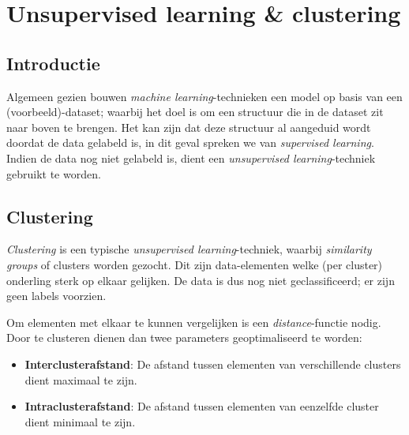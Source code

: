 \chapter{Unsupervised learning \& clustering}
\section{Introductie}
Algemeen gezien bouwen \emph{machine learning}-technieken een model op basis van een (voorbeeld)-dataset; waarbij het doel is om een structuur die in de dataset zit naar boven te brengen. Het kan zijn dat deze structuur al aangeduid wordt doordat de data gelabeld is, in dit geval spreken we van \emph{supervised learning}. Indien de data nog niet gelabeld is, dient een \emph{unsupervised learning}-techniek gebruikt te worden.

\section{Clustering}
\emph{Clustering} is een typische \emph{unsupervised learning}-techniek, waarbij \emph{similarity groups} of clusters worden gezocht. Dit zijn data-elementen welke (per cluster) onderling sterk op elkaar gelijken. De data is dus nog niet geclassificeerd; er zijn geen labels voorzien. 

Om elementen met elkaar te kunnen vergelijken is een \emph{distance}-functie nodig. Door te clusteren dienen dan twee parameters geoptimaliseerd te worden:

\begin{itemize}
\item \textbf{Interclusterafstand}: De afstand tussen elementen van verschillende clusters dient maximaal te zijn. 
\item \textbf{Intraclusterafstand}: De afstand tussen elementen van eenzelfde cluster dient minimaal te zijn.
\end{itemize}

